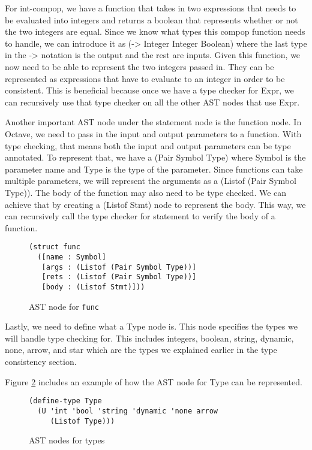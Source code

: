 For int-compop, we have a function that takes in two expressions that needs to be evaluated into integers and returns a boolean that represents whether or not the two integers are equal. Since we know what types this compop function needs to handle, we can introduce it as (-> Integer Integer Boolean) where the last type in the -> notation is the output and the rest are inputs. Given this function, we now need to be able to represent the two integers passed in. They can be represented as expressions that have to evaluate to an integer in order to be consistent. This is beneficial because once we have a type checker for Expr, we can recursively use that type checker on all the other AST nodes that use Expr. 

Another important AST node under the statement node is the function node. In Octave, we need to pass in the input and output parameters to a function. With type checking, that means both the input and output parameters can be type annotated. To represent that, we have a (Pair Symbol Type) where Symbol is the parameter name and Type is the type of the parameter. Since functions can take multiple parameters, we will represent the arguments as a (Listof (Pair Symbol Type)). The body of the function may also need to be type checked. We can achieve that by creating a (Listof Stmt) node to represent the body. This way, we can recursively call the type checker for statement to verify the body of a function.

\begin{figure}[h]
    \begin{lstlisting}[language=racket]
(struct func
  ([name : Symbol]
   [args : (Listof (Pair Symbol Type))]
   [rets : (Listof (Pair Symbol Type))]
   [body : (Listof Stmt)]))
    \end{lstlisting}
    \caption[]{AST node for {\tt func}}
    \label{fig:func}
\end{figure}

Lastly, we need to define what a Type node is. This node specifies the types we will handle type checking for. This includes integers, boolean, string, dynamic, none, arrow, and star which are the types we explained earlier in the type consistency section. 

Figure \ref{fig:type} includes an example of how the AST node for Type can be represented.

\begin{figure}[h]
    \begin{lstlisting}[language=racket]
(define-type Type
  (U 'int 'bool 'string 'dynamic 'none arrow
     (Listof Type)))
    \end{lstlisting}
    \caption[]{AST nodes for types}
    \label{fig:type}
\end{figure}

